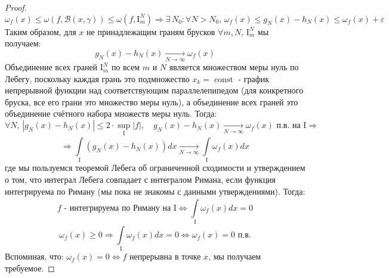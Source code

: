 \documentclass[12pt]{article}
\newcommand{\MI}{\mathrm{I}}
\newcommand{\MB}{\mathcal{B}}
\newcommand{\VE}{\varepsilon}
\theoremstyle{definition}
\DeclareMathOperator{\const}{\text{const}}
\newcommand{\ddint}[2]{\displaystyle\int\limits_{#1}^{#2}}
\begin{document}
\begin{proof}
	$$
		\omega_f(x) \leq \omega(f,\MB(x,\gamma)) \leq \omega(f,\MI_m^N) \Rightarrow \exists\, N_0 \colon \forall N > N_0, \, \omega_f(x) \leq g_N(x) - h_N(x) \leq \omega_f(x) + \VE
	$$
	Таким образом, для $x$ не принадлежащим граням брусков $\forall m,N, \, \MI_m^N$ мы получаем:
	$$
		g_N(x) - h_N(x) \xrightarrow[N\to  \infty]{} \omega_f(x)
	$$
	Объединение всех граней $\MI_m^N$ по всем $m$ и $N$ является множеством меры нуль по Лебегу, поскольку каждая грань это подмножество $x_k = \const$ - график непрерывной функции над соответствующим параллелепипедом (для конкретного бруска, все его грани это множество меры нуль), а объединение всех граней это объединение счётного набора множеств меры нуль. Тогда:
	$$
		\forall N, \,  |g_N(x) - h_N(x)| \leq 2{\cdot}\sup\limits_{\MI}|f|, \quad g_N(x) - h_N(x) \xrightarrow[N \to \infty]{} \omega_f(x) \text{ п.в. на } \MI \Rightarrow
	$$
	$$
		\Rightarrow \ddint{\MI}{}(g_N(x) - h_N(x))dx \xrightarrow[N\to \infty]{} \ddint{\MI}{}\omega_f(x)dx 
	$$
	где мы пользуемся теоремой Лебега об ограниченной сходимости и утверждением о том, что интеграл Лебега совпадает с интегралом Римана, если функция интегрируема по Риману (мы пока не знакомы с данными утверждениями). Тогда:
	$$
		f \text{ - интегрируема по Риману на } \MI \Leftrightarrow \ddint{\MI}{}\omega_f(x)dx = 0
	$$
	$$	
		\omega_f(x) \geq 0 \Rightarrow \ddint{\MI}{}\omega_f(x)dx = 0 \Leftrightarrow \omega_f(x) = 0 \text{ п.в.}
	$$
	Вспоминая, что: $\omega_f(x) = 0 \Leftrightarrow f$ непрерывна в точке $x$, мы получаем требуемое.
\end{proof}
\end{document}
